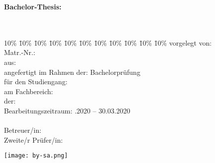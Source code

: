 \begin{titlepage}
  \begin{center}
  \textbf{Bachelor-Thesis:}\\
  \Huge{\textbf{\myTitel}}\\
  \LARGE{\mySubtitel}\\
  \vspace{0.2cm}
  \end{center}
  \normalsize
  \vfill
  \begin{tabbing}
    10\% \= 10\% \= 10\% \= 10\% \= 10\% \= 10\% \= 10\% \= 10\% \= 10\% \= 10\% \= 10\% \kill
    vorgelegt von: \> \> \> \> \> \> \> \> \> \> \myAutor\\
    Matr.-Nr.: \> \> \> \> \> \> \> \> \> \> \myMatrikelNr\\
    aus: \> \> \> \> \> \> \> \> \> \> \myLocation\\
    angefertigt im Rahmen der: \> \> \> \> \> \> \> \> \> \>  Bachelorprüfung\\%
    für den Studiengang: \> \> \> \> \> \> \> \> \> \> \myStudiengang \\
    am Fachbereich: \> \> \> \> \> \> \> \> \> \> \myFachbereich\\
    der:  \> \> \> \> \> \> \> \> \> \> \myHochschulName \\
    Bearbeitungszeitraum: \> \> \> \> \> \> \> \> \> .2020 -- 30.03.2020 \\
    \\
    Betreuer/in: \> \> \> \> \> \> \> \> \> \> \myBetreuer\\
    Zweite/r Prüfer/in: \> \> \> \> \> \> \> \> \> \> \myZweitpruefer\\
  \end{tabbing}
\texttt{[image: by-sa.png]}
\end{titlepage}
